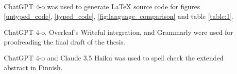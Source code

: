 
ChatGPT 4-o was used to generate LaTeX source code for figures \ref{untyped_code}, \ref{typed_code}, \ref{fig:language_comparison} and table \ref{table:1}. 

ChatGPT 4-o, Overleaf's Writeful integration, and Grammarly were used for proofreading the final draft of the thesis.

ChatGPT 4-o and Claude 3.5 Haiku was used to spell check the extended abstract in Finnish.